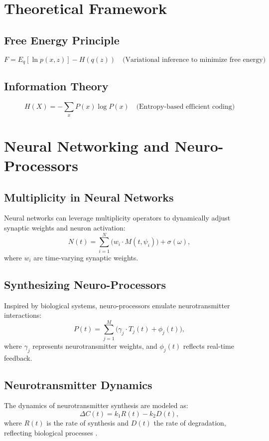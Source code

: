 \documentclass{article}
\theoremstyle{plain}
\begin{document}
\section{Theoretical Framework}

\subsection{Free Energy Principle}
\begin{equation}
    F = E_q[\ln p(x, z)] - H(q(z)) \quad \text{(Variational inference to minimize free energy)}
\end{equation}

\subsection{Information Theory}
\begin{equation}
    H(X) = -\sum_{x} P(x)\log P(x) \quad \text{(Entropy-based efficient coding)}
\end{equation}

\section{Neural Networking and Neuro-Processors}

\subsection{Multiplicity in Neural Networks}
Neural networks can leverage multiplicity operators to dynamically adjust synaptic weights and neuron activation:
\begin{equation}
    N(t) = \sum_{i=1}^{N} \big(w_i \cdot M(t, \psi_i)\big) + \sigma(\omega),
\end{equation}
where $w_i$ are time-varying synaptic weights.

\subsection{Synthesizing Neuro-Processors}
Inspired by biological systems, neuro-processors emulate neurotransmitter interactions:
\begin{equation}
    P(t) = \sum_{j=1}^{M} \Big(\gamma_j \cdot T_j(t) + \phi_j(t)\Big),
\end{equation}
where $\gamma_j$ represents neurotransmitter weights, and $\phi_j(t)$ reflects real-time feedback.

\subsection{Neurotransmitter Dynamics}
The dynamics of neurotransmitter synthesis are modeled as:
\begin{equation}
    \Delta C(t) = k_1 R(t) - k_2 D(t),
\end{equation}
where $R(t)$ is the rate of synthesis and $D(t)$ the rate of degradation, reflecting biological processes \cite{carhart1998computational}.
\end{document}
